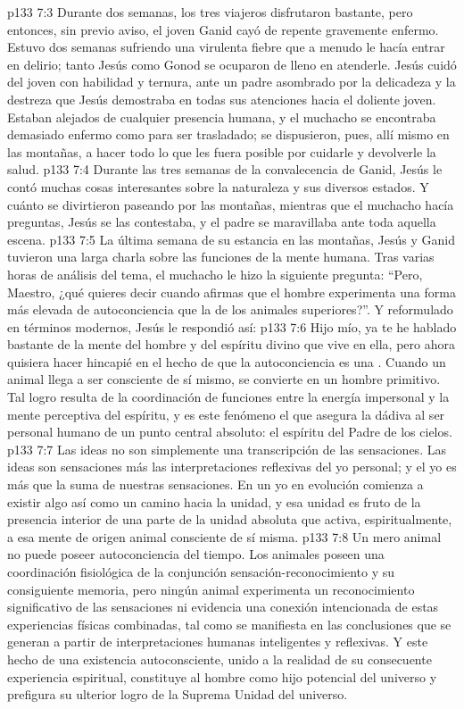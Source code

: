 \vs p133 7:3 Durante dos semanas, los tres viajeros disfrutaron bastante, pero entonces, sin previo aviso, el joven Ganid cayó de repente gravemente enfermo. Estuvo dos semanas sufriendo una virulenta fiebre que a menudo le hacía entrar en delirio; tanto Jesús como Gonod se ocuparon de lleno en atenderle. Jesús cuidó del joven con habilidad y ternura, ante un padre asombrado por la delicadeza y la destreza que Jesús demostraba en todas sus atenciones hacia el doliente joven. Estaban alejados de cualquier presencia humana, y el muchacho se encontraba demasiado enfermo como para ser trasladado; se dispusieron, pues, allí mismo en las montañas, a hacer todo lo que les fuera posible por cuidarle y devolverle la salud.
\vs p133 7:4 Durante las tres semanas de la convalecencia de Ganid, Jesús le contó muchas cosas interesantes sobre la naturaleza y sus diversos estados. Y cuánto se divirtieron paseando por las montañas, mientras que el muchacho hacía preguntas, Jesús se las contestaba, y el padre se maravillaba ante toda aquella escena.
\vs p133 7:5 La última semana de su estancia en las montañas, Jesús y Ganid tuvieron una larga charla sobre las funciones de la mente humana. Tras varias horas de análisis del tema, el muchacho le hizo la siguiente pregunta: “Pero, Maestro, ¿qué quieres decir cuando afirmas que el hombre experimenta una forma más elevada de autoconciencia que la de los animales superiores?”. Y reformulado en términos modernos, Jesús le respondió así:
\vs p133 7:6 \pc Hijo mío, ya te he hablado bastante de la mente del hombre y del espíritu divino que vive en ella, pero ahora quisiera hacer hincapié en el hecho de que la autoconciencia es una . Cuando un animal llega a ser consciente de sí mismo, se convierte en un hombre primitivo. Tal logro resulta de la coordinación de funciones entre la energía impersonal y la mente perceptiva del espíritu, y es este fenómeno el que asegura la dádiva al ser personal humano de un punto central absoluto: el espíritu del Padre de los cielos.
\vs p133 7:7 Las ideas no son simplemente una transcripción de las sensaciones. Las ideas son sensaciones más las interpretaciones reflexivas del yo personal; y el yo es más que la suma de nuestras sensaciones. En un yo en evolución comienza a existir algo así como un camino hacia la unidad, y esa unidad es fruto de la presencia interior de una parte de la unidad absoluta que activa, espiritualmente, a esa mente de origen animal consciente de sí misma.
\vs p133 7:8 Un mero animal no puede poseer autoconciencia del tiempo. Los animales poseen una coordinación fisiológica de la conjunción sensación\hyp{}reconocimiento y su consiguiente memoria, pero ningún animal experimenta un reconocimiento significativo de las sensaciones ni evidencia una conexión intencionada de estas experiencias físicas combinadas, tal como se manifiesta en las conclusiones que se generan a partir de interpretaciones humanas inteligentes y reflexivas. Y este hecho de una existencia autoconsciente, unido a la realidad de su consecuente experiencia espiritual, constituye al hombre como hijo potencial del universo y prefigura su ulterior logro de la Suprema Unidad del universo.

